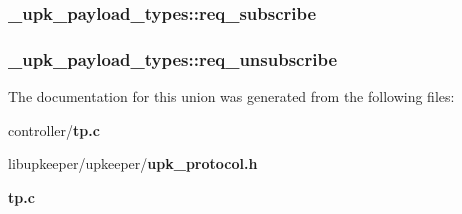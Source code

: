 \subsubsection[{req\_\-subscribe}]{ {\bf \_\-upk\_\-payload\_\-types::req\_\-subscribe}}\label{union__upk__payload__types_a5b88e06488f6a6b32f3173071fe3d5a0}
\subsubsection[{req\_\-unsubscribe}]{ {\bf \_\-upk\_\-payload\_\-types::req\_\-unsubscribe}}\label{union__upk__payload__types_aa40a745f243b9efe2c32284a2e5c0707}


The documentation for this union was generated from the following files:\begin{DoxyCompactItemize}
\item 
controller/{\bf tp.c}\item 
libupkeeper/upkeeper/{\bf upk\_\-protocol.h}\item 
{\bf tp.c}\end{DoxyCompactItemize}
